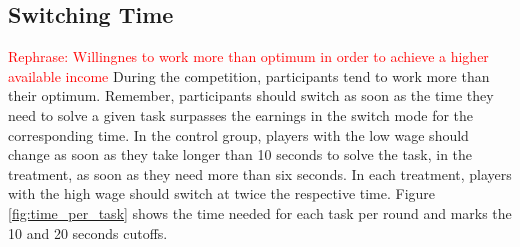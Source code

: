 \begin{table}[!htbp] \centering 
  \caption{Linear Mixed Model - Net Income} 
  \label{table:earnings_lmer}
\end{table} 


\subsection{Switching Time}
\textcolor{red}{Rephrase: Willingnes to work more than optimum in order to achieve a higher available income}
During the competition, participants tend to work more than their optimum. Remember, participants should switch as soon as the time they need to solve a given task surpasses the earnings in the switch mode for the corresponding time. In the control group, players with the low wage should change as soon as they take longer than 10 seconds to solve the task, in the treatment, as soon as they need more than six seconds. In each treatment, players with the high wage should switch at twice the respective time. Figure \ref{fig:time_per_task} shows the time needed for each task per round and marks the 10 and 20 seconds cutoffs.\\

